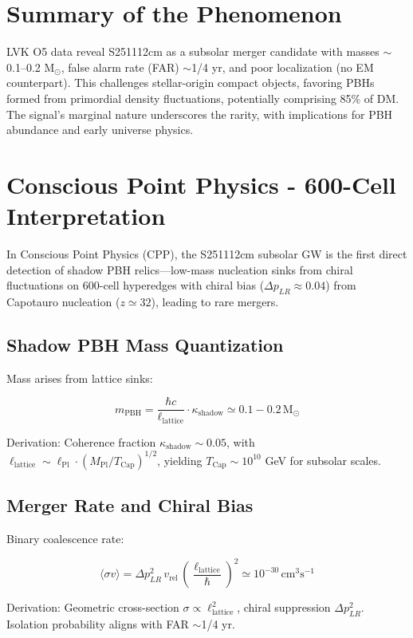 \documentclass[11pt]{article}
\begin{document}
\section{Summary of the Phenomenon}
LVK O5 data reveal S251112cm as a subsolar merger candidate with masses $\sim$0.1--0.2 M$_\odot$, false alarm rate (FAR) $\sim$1/4 yr, and poor localization (no EM counterpart). This challenges stellar-origin compact objects, favoring PBHs formed from primordial density fluctuations, potentially comprising 85\% of DM. The signal's marginal nature underscores the rarity, with implications for PBH abundance and early universe physics.

\section{Conscious Point Physics - 600-Cell Interpretation}
In Conscious Point Physics (CPP), the S251112cm subsolar GW is the first direct detection of shadow PBH relics—low-mass nucleation sinks from chiral fluctuations on 600-cell hyperedges with chiral bias ($\Delta p_{LR} \approx 0.04$) from Capotauro nucleation ($z \simeq 32$), leading to rare mergers.

\subsection{Shadow PBH Mass Quantization}
Mass arises from lattice sinks:

\[
m_{\text{PBH}} = \frac{\hbar c}{\ell_{\text{lattice}}} \cdot \kappa_{\text{shadow}} \simeq 0.1 - 0.2 \, \text{M}_\odot
\]

Derivation: Coherence fraction $\kappa_{\text{shadow}} \sim 0.05$, with $\ell_{\text{lattice}} \sim \ell_{\text{Pl}} \cdot (M_{\text{Pl}} / T_{\text{Cap}})^{1/2}$, yielding $T_{\text{Cap}} \sim 10^{10}$ GeV for subsolar scales.

\subsection{Merger Rate and Chiral Bias}
Binary coalescence rate:

\[
\langle \sigma v \rangle = \Delta p_{LR}^2 \, v_{\text{rel}} \, \left( \frac{\ell_{\text{lattice}}}{\hbar} \right)^2 \simeq 10^{-30} \, \text{cm}^3 \text{s}^{-1}
\]

Derivation: Geometric cross-section $\sigma \propto \ell_{\text{lattice}}^2$, chiral suppression $\Delta p_{LR}^2$. Isolation probability aligns with FAR $\sim$1/4 yr.
\end{document}
